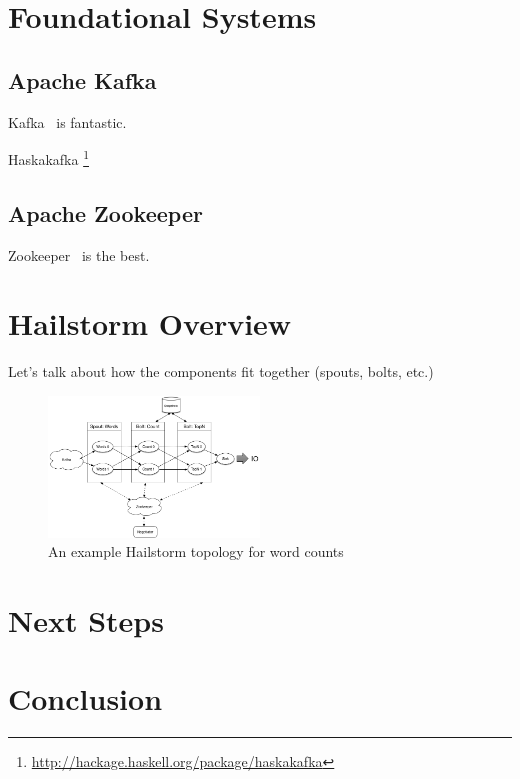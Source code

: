 \documentclass[10pt,nocopyrightspace]{sigplanconf}
\begin{document}
\section{Foundational Systems}
\subsection{Apache Kafka}
Kafka~\cite{kafka} is fantastic.

Haskakafka \footnote{\url{http://hackage.haskell.org/package/haskakafka}}

\subsection{Apache Zookeeper}
Zookeeper~\cite{zookeeper} is the best.


\section{Hailstorm Overview}
Let's talk about how the components fit together 
(spouts, bolts, etc.)

\begin{figure}
\centering
\includegraphics[width=0.5\textwidth]{images/architecture.png}
\caption{An example Hailstorm topology for word counts}
\end{figure}

\section{Next Steps}

\section{Conclusion}

{}

\end{document}
